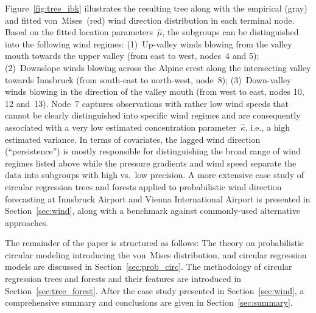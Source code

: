 \documentclass[nojss,shortnames]{jss}
\numberwithin{equation}{section}
\begin{document}
Figure~\ref{fig:tree_ibk} illustrates the resulting tree along with the
empirical (gray) and fitted von~Mises~(red) wind direction distribution in each
terminal node. Based on the fitted location parameters~$\hat \mu$, the
subgroups can be distinguished into the following wind regimes: (1)~Up-valley
winds blowing from the valley mouth towards the upper valley (from east to
west, nodes~4 and 5); (2)~Downslope winds blowing across the Alpine crest along
the intersecting valley towards Innsbruck (from south-east to north-west,
node~8); (3)~Down-valley winds blowing in the direction of the valley mouth
(from west to east, nodes 10, 12 and~13). Node~7 captures observations with
rather low wind speeds that cannot be clearly distinguished into specific wind
regimes and are consequently associated with a very low estimated concentration
parameter~$\hat{\kappa}$, i.e., a high estimated variance. In terms of
covariates, the lagged wind direction (``persistence'') is mostly responsible
for distinguishing the broad range of wind regimes listed above while the
pressure gradients and wind speed separate the data into subgroups with high
vs.\ low precision. A more extensive case study of circular regression trees
and forests applied to probabilistic wind direction forecasting at Innsbruck
Airport and Vienna International Airport is presented in
Section~\ref{sec:wind}, along with a benchmark against commonly-used
alternative approaches.

The remainder of the paper is structured as follows: The theory on
probabilistic circular modeling introducing the von~Mises distribution, and
circular regression models are discussed in Section~\ref{sec:prob_circ}. The
methodology of circular regression trees and forests and their features are
introduced in Section~\ref{sec:tree_forest}. After the case study presented in
Section~\ref{sec:wind}, a comprehensive summary and conclusions are given in
Section~\ref{sec:summary}.

\end{document}
